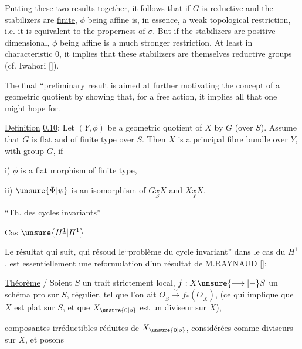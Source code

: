 

Putting these two results together, it follows that if $G$ is reductive and the stabilizers are \uline{finite}, $\phi$ being affine is, in essence, a weak topological restriction, i.e. it is equivalent to the properness of $\sigma$. But if the stabilizers are positive dimensional, $\phi$ being affine is a much stronger restriction. At least in characteristic 0, it implies that these stabilizers are themselves reductive groups (cf. Iwahori [\quad]).

The final ``preliminary result is aimed at further motivating the concept of a geometric quotient by showing that, for a free action, it implies all that one might hope for.

\uline{Definition} \uline{0.10}: Let $(Y,\phi)$ be a geometric quotient of $X$ by $G$ (over $S$). Assume that $G$ is flat and of finite type over $S$. Then $X$ is a \uline{principal} \uline{fibre} \uline{bundle} over $Y$, with group $G$, if

\qquad i) $\phi$ is a flat morphism of finite type,

\qquad ii) $\unsure{\bar\Psi|\bar\psi}$ is an isomorphism of $G\mathbin{\underset{S}{x}}X$ and $X\mathbin{\underset{Y}{x}}X$.



``Th. des cycles invariants''

Cas  $\unsure{H^{\underline{1}}|H^1}$



Le résultat qui suit, qui résoud le``problème du cycle invariant'' dans le cas du $H^1$, est essentiellement une reformulation d'un résultat de M.RAYNAUD [\quad]:
\margin{$\times$}

\uline{Théorème} / Soient $S$ un trait strictement local, $f:X\unsure{\longrightarrow|\mathbin{-}} S$ un schéma pro sur $S$, régulier, tel que l'on ait $\underline{O}_S\xrightarrow{\sim}f_*(\underline{O}_X)$, (ce qui implique que $X$ est plat sur $S$, et que $X_{\unsure{0|o}}$ est un diviseur sur $X$),  composantes irréductibles réduites de $X_{\unsure{0|o}}$, considérées comme diviseurs sur $X$, et posons 

